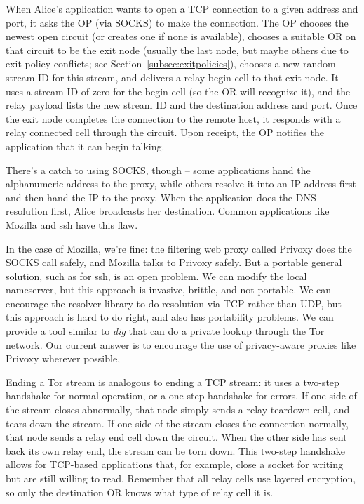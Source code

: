 \documentclass[times,10pt,twocolumn]{article}
\begin{document}
\label{subsec:tcp}

When Alice's application wants to open a TCP connection to a given
address and port, it asks the OP (via SOCKS) to make the connection. The
OP chooses the newest open circuit (or creates one if none is available),
chooses a suitable OR on that circuit to be the exit node (usually the
last node, but maybe others due to exit policy conflicts; see
Section~\ref{subsec:exitpolicies}), chooses a new random stream ID for
this stream,
and delivers a relay begin cell to that exit node. It uses a stream ID
of zero for the begin cell (so the OR will recognize it), and the relay
payload lists the new stream ID and the destination address and port.
Once the exit node completes the connection to the remote host, it
responds with a relay connected cell through the circuit. Upon receipt,
the OP notifies the application that it can begin talking.

There's a catch to using SOCKS, though -- some applications hand the
alphanumeric address to the proxy, while others resolve it into an IP
address first and then hand the IP to the proxy. When the application
does the DNS resolution first, Alice broadcasts her destination. Common
applications like Mozilla and ssh have this flaw.

In the case of Mozilla, we're fine: the filtering web proxy called Privoxy
does the SOCKS call safely, and Mozilla talks to Privoxy safely. But a
portable general solution, such as for ssh, is an open problem. We can
modify the local nameserver, but this approach is invasive, brittle, and
not portable. We can encourage the resolver library to do resolution
via TCP rather than UDP, but this approach is hard to do right, and also
has portability problems. We can provide a tool similar to \emph{dig} that
can do a private lookup through the Tor network. Our current answer is to
encourage the use of privacy-aware proxies like Privoxy wherever possible,

Ending a Tor stream is analogous to ending a TCP stream: it uses a
two-step handshake for normal operation, or a one-step handshake for
errors. If one side of the stream closes abnormally, that node simply
sends a relay teardown cell, and tears down the stream. If one side
of the stream closes the connection normally, that node sends a relay
end cell down the circuit. When the other side has sent back its own
relay end, the stream can be torn down. This two-step handshake allows
for TCP-based applications that, for example, close a socket for writing
but are still willing to read. Remember that all relay cells use layered
encryption, so only the destination OR knows what type of relay cell
it is.
\end{document}
